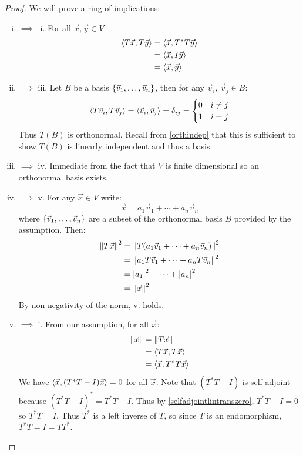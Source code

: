 \begin{proof} We will prove a ring of implications:
  \begin{enumerate}[i.] %
    \item{$\implies$ ii.}
      For all $\vec x, \vec y \in V$:
        \begin{align}
          \left\langle T \vec x , T \vec y \right\rangle
            &= \left\langle \vec x , T^* T \vec y \right\rangle \\
            &= \left\langle \vec x , I \vec y \right\rangle \\
            &= \left\langle \vec x , \vec y \right\rangle
        \end{align}
    \item{$\implies$ iii.}
      Let $B$ be a basis $\left\{\vec v_1, \ldots, \vec v_n\right\}$, then for any $\vec v_i$, $\vec v_j \in B$:
        $$\left\langle T \vec v_i , T \vec v_j \right\rangle = \left\langle \vec v_i , \vec v_j \right\rangle = \delta_{ij} = \begin{cases}
          0 & i \ne j \\
          1 & i = j
        \end{cases}$$
      Thus $T(B)$ is orthonormal.
      Recall from \ref{orthindep} that this is sufficient to show $T(B)$ is linearly independent and thus a basis.
    \item{$\implies$ iv.}
      Immediate from the fact that $V$ is finite dimensional so an orthonormal basis exists.
    \item{$\implies$ v.}
      For any $\vec x \in V$ write:
        $$\vec x = a_1 \vec v_1 + \cdots + a_n \vec v_n$$
      where $\left\{\vec v_1, \ldots, \vec v_n\right\}$ are a subset of the orthonormal basis $B$ provided by the assumption. Then:
      \begin{align}
        \left\lVert T \vec x\right\rVert^2
          &= \left\lVert T(a_1\vec v_1 + \cdots + a_n \vec v_n)\right\rVert^2 \\
          &= \left\lVert a_1T\vec v_1 + \cdots + a_nT\vec v_n\right\rVert^2 \\
          &= \left|a_1\right|^2 + \cdots + \left|a_n\right|^2 \\
          &= \left\lVert\vec x\right\rVert^2
      \end{align}
      By non-negativity of the norm, v. holds.
    \item{$\implies$ i.} From our assumption, for all $\vec x$:
      \begin{align}
        \left\lVert\vec x\right\rVert
          &= \left\lVert T \vec x\right\rVert \\
          &= \left\langle T \vec x , T \vec x \right\rangle \\
          &= \left\langle \vec x , T^* T \vec x \right\rangle
      \end{align}
      We have $\left\langle \vec x , (T^*T - I) \vec x \right\rangle = 0$ for all $\vec x$.
      Note that $(T^*T - I)$ is self-adjoint because $(T^*T-I)^* = T^*T - I$.
      Thus by \ref{selfadjointlintranszero}, $T^*T-I = 0$ so $T^*T = I$.
      Thus $T^*$ is a left inverse of $T$, so since $T$ is an endomorphism, $T^*T = I = T T^*$.
  \end{enumerate}
\end{proof}
